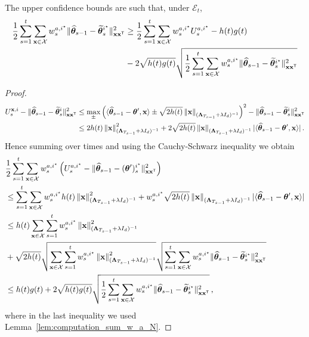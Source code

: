 \begin{lemma}
The upper confidence bounds are such that, under $\mathcal E_t$,
\begin{align*}
    \frac{1}{2}\sum_{s=1}^t \sum_{{\bf x}\in\mathcal{X}} w_s^{a,i^\star}\Vert \widehat{{\boldsymbol \theta}}_{s-1} - \widetilde{{\boldsymbol \theta}}_s^{i^\star}\Vert_{{\bf x}{\bf x}^\mathsf{\scriptscriptstyle T}}^2\label{eq:only_istar}
    &\ge \frac{1}{2}\sum_{s=1}^t\sum_{{\bf x}\in\mathcal{X}} w_s^{a,i^\star}U_s^{a,i^\star} - h(t)g(t)\\ 
    &-2\sqrt{ h(t) g(t)}  \sqrt{\frac{1}{2}\sum_{s=1}^t \sum_{{\bf x}\in\mathcal{X}} w_s^{a,i^\star}\Vert \widehat{{\boldsymbol \theta}}_{s-1} - \widetilde{{\boldsymbol \theta}}_s^{i^\star} \Vert_{{\bf x}{\bf x}^\mathsf{\scriptscriptstyle T}}^2}
\end{align*}
\end{lemma}
\begin{proof}
\begin{align*}
U_s^{{\bf x},i} -\Vert \widehat{{\boldsymbol \theta}}_{s-1} - \widetilde{{\boldsymbol \theta}}_s^i\Vert_{{\bf x}{\bf x}^\mathsf{\scriptscriptstyle T}}^2
&\leq   \max_\pm \left( \langle \widehat{{\boldsymbol \theta}}_{s-1} - {\boldsymbol \theta}',{\bf x}\rangle \pm \sqrt{2 h(t)} \left\lVert{\bf x}\right\rVert_{({\boldsymbol \Lambda}_{T_{s-1}}+ \lambda I_d)^{-1}} \right)^2-\Vert \widehat{{\boldsymbol \theta}}_{s-1} - \widetilde{{\boldsymbol \theta}}_s^i\Vert_{{\bf x}{\bf x}^\mathsf{\scriptscriptstyle T}}^2\\
&\leq  2h(t)\left\lVert{\bf x}\right\rVert^2_{({\boldsymbol \Lambda}_{T_{s-1}}+ \lambda I_d)^{-1}} + 2\sqrt{2 h(t)} \left\lVert{\bf x}\right\rVert_{({\boldsymbol \Lambda}_{T_{s-1}}+ \lambda I_d)^{-1}}| \langle \widehat{{\boldsymbol \theta}}_{s-1} - {\boldsymbol \theta}',{\bf x}\rangle|\,.\\
\end{align*}
Hence summing over times and using the Cauchy-Schwarz inequality we obtain
\begin{align*}
&\frac{1}{2}\sum_{s=1}^t\sum_{{\bf x}\in\mathcal{X}} w_s^{a,i^\star}\left(U_s^{a,i^\star} -\Vert \widehat{{\boldsymbol \theta}}_{s-1} - ({\boldsymbol \theta}')_s^{i^\star}\Vert_{{\bf x}{\bf x}^\mathsf{\scriptscriptstyle T}}^2\right)
\\
&\le \sum_{s=1}^t \sum_{{\bf x}\in\mathcal{X}} w_s^{a,i^\star}h(t)\left\lVert{\bf x}\right\rVert^2_{({\boldsymbol \Lambda}_{T_{s-1}}+ \lambda I_d)^{-1}} +w_s^{a,i^\star} \sqrt{2 h(t)} \left\lVert{\bf x}\right\rVert_{({\boldsymbol \Lambda}_{T_{s-1}}+ \lambda I_d)^{-1}}| \langle \widehat{{\boldsymbol \theta}}_{s-1} - {\boldsymbol \theta}',{\bf x}\rangle|
\\
&\le  h(t) \sum_{{\bf x}\in\mathcal{X}} \sum_{s=1}^t w_s^{a,i^\star}\left\lVert{\bf x}\right\rVert^2_{({\boldsymbol \Lambda}_{T_{s-1}}+ \lambda I_d)^{-1}}\\
&+ \sqrt{2 h(t)} \sqrt{\sum_{{\bf x}\in\mathcal{X}} \sum_{s=1}^t w_s^{a,i^\star}\left\lVert{\bf x}\right\rVert^2_{({\boldsymbol \Lambda}_{T_{s-1}}+ \lambda I_d)^{-1}}}  \sqrt{\sum_{s=1}^t \sum_{{\bf x}\in\mathcal{X}} w_s^{a,i^\star}\Vert \widehat{{\boldsymbol \theta}}_{s-1} - \widetilde{{\boldsymbol \theta}}_s^{i^\star} \Vert_{{\bf x}{\bf x}^\mathsf{\scriptscriptstyle T}}^2} \\
&\leq h(t)g(t) +2\sqrt{ h(t) g(t)}  \sqrt{\frac{1}{2}\sum_{s=1}^t \sum_{{\bf x}\in\mathcal{X}} w_s^{a,i^\star}\Vert \widehat{{\boldsymbol \theta}}_{s-1} - \widetilde{{\boldsymbol \theta}}_s^{i^\star} \Vert_{{\bf x}{\bf x}^\mathsf{\scriptscriptstyle T}}^2}\,,
\end{align*}
where in the last inequality we used Lemma~\ref{lem:computation_sum_w_a_N}.
\end{proof}

